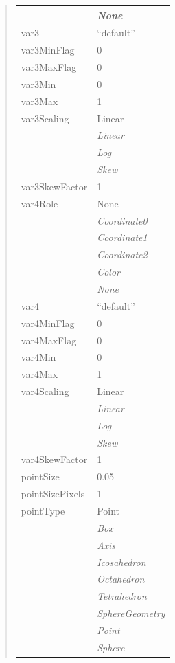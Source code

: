 \documentclass[letterpaper,10pt,english]{sphinxmanual}
\begin{document}
\begin{quote}
\begin{longtable}{|l|l|}
\hline & 
\emph{None}
\\
\hline
var3
 & 
``default''
\\
\hline
var3MinFlag
 & 
0
\\
\hline
var3MaxFlag
 & 
0
\\
\hline
var3Min
 & 
0
\\
\hline
var3Max
 & 
1
\\
\hline
var3Scaling
 & 
Linear
\\
\hline & 
\emph{Linear}
\\
\hline & 
\emph{Log}
\\
\hline & 
\emph{Skew}
\\
\hline
var3SkewFactor
 & 
1
\\
\hline
var4Role
 & 
None
\\
\hline & 
\emph{Coordinate0}
\\
\hline & 
\emph{Coordinate1}
\\
\hline & 
\emph{Coordinate2}
\\
\hline & 
\emph{Color}
\\
\hline & 
\emph{None}
\\
\hline
var4
 & 
``default''
\\
\hline
var4MinFlag
 & 
0
\\
\hline
var4MaxFlag
 & 
0
\\
\hline
var4Min
 & 
0
\\
\hline
var4Max
 & 
1
\\
\hline
var4Scaling
 & 
Linear
\\
\hline & 
\emph{Linear}
\\
\hline & 
\emph{Log}
\\
\hline & 
\emph{Skew}
\\
\hline
var4SkewFactor
 & 
1
\\
\hline
pointSize
 & 
0.05
\\
\hline
pointSizePixels
 & 
1
\\
\hline
pointType
 & 
Point
\\
\hline & 
\emph{Box}
\\
\hline & 
\emph{Axis}
\\
\hline & 
\emph{Icosahedron}
\\
\hline & 
\emph{Octahedron}
\\
\hline & 
\emph{Tetrahedron}
\\
\hline & 
\emph{SphereGeometry}
\\
\hline & 
\emph{Point}
\\
\hline & 
\emph{Sphere}
\\
\hline

\end{longtable}
\end{quote}
\end{document}
